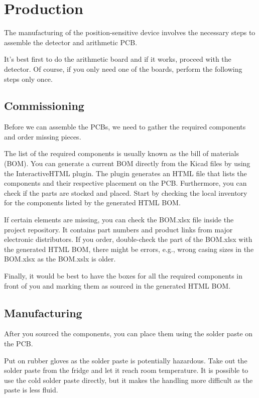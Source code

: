 \section{Production}

The manufacturing of the position-sensitive device involves the necessary steps to assemble the detector and arithmetic PCB.

It's best first to do the arithmetic board and if it works, proceed with the detector. Of course, if you only need one of the boards, perform the following steps only once.

\subsection{Commissioning}

Before we can assemble the PCBs, we need to gather the required components and order missing pieces.

The list of the required components is usually known as the bill of materials (BOM). You can generate a current BOM directly from the Kicad files by using the InteractiveHTML plugin. The plugin generates an HTML file that lists the components and their respective placement on the PCB. Furthermore, you can check if the parts are stocked and placed. Start by checking the local inventory for the components listed by the generated HTML BOM.

If certain elements are missing, you can check the BOM.xlsx file inside the project repository. It contains part numbers and product links from major electronic distributors. If you order, double-check the part of the BOM.xlsx with the generated HTML BOM, there might be errors, e.g., wrong casing sizes in the BOM.xlsx as the BOM.xslx is older.

Finally, it would be best to have the boxes for all the required components in front of you and marking them as sourced in the generated HTML BOM.

\subsection{Manufacturing}

After you sourced the components, you can place them using the solder paste on the PCB.

Put on rubber gloves as the solder paste is potentially hazardous. Take out the solder paste from the fridge and let it reach room temperature. It is possible to use the cold solder paste directly, but it makes the handling more difficult as the paste is less fluid.

